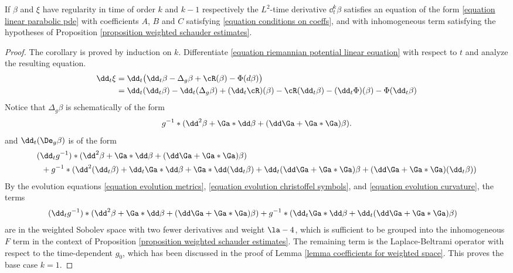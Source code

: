 \documentclass[hidelinks, 12pt, oneside, reqno]{amsart}
\begin{document}
\begin{cor}\label{corollary coefficients for weighted space time derivs}
    If $\beta$ and $\xi$ have regularity in time of order $k$ and $k-1$ respectively the $L^2$-time derivative $\dd^k_t \beta$ satisfies an equation of the form \eqref{equation linear parabolic pde} with coefficients $A$, $B$ and $C$ satisfying \eqref{equation conditions on coeffs}, and with inhomogeneous term satisfying the hypotheses of Proposition \ref{proposition weighted schauder estimates}. 
\end{cor}

\begin{proof}
The corollary is proved by induction on $k$. Differentiate \eqref{equation riemannian potential linear equation} with respect to $t$ and analyze the resulting equation. 
\begin{align*}
    \dd_t \xi &= \dd_t\big(\dd_t \beta - \Delta_g \beta + \cR(\beta) - \Phi(d\beta)\big)  \\
    &= \dd_t (\dd_t \beta) - \dd_t (\Delta_g \beta) + (\dd_t\cR)(\beta) - \cR(\dd_t \beta) - (\dd_t \Phi)(\beta) - \Phi(\dd_t \beta)
\end{align*}
Notice that $ \Delta_g \beta $ is schematically of the form 
\[
g^{-1} * (\dd^2 \beta + \Ga * \dd \beta + (\dd \Ga + \Ga * \Ga) \beta). 
\]
and $\dd_t (\De_g \beta)$ is of the form
\begin{align*}
    &(\dd_t g^{-1}) * (\dd^2 \beta + \Ga * \dd \beta + (\dd \Ga + \Ga * \Ga) \beta) \\
    &\;\;+ g^{-1} * (\dd^2 (\dd_t \beta) + \dd_t \Ga * \dd \beta + \Ga * \dd (\dd_t \beta) +  \dd_t(\dd \Ga + \Ga * \Ga) \beta + (\dd \Ga + \Ga * \Ga) (\dd_t \beta))
\end{align*}
By the evolution equations \eqref{equation evolution metrics}, \eqref{equation evolution christoffel symbols}, and \eqref{equation evolution curvature}, the terms 
\begin{align*}
    &(\dd_t g^{-1}) * (\dd^2 \beta + \Ga * \dd \beta + (\dd \Ga + \Ga * \Ga) \beta) + g^{-1} * (\dd_t \Ga * \dd \beta +  \dd_t(\dd \Ga + \Ga * \Ga) \beta )
\end{align*}
are in the weighted Sobolev space with two fewer derivatives and weight $\la -4$, which is sufficient to be grouped into the inhomogeneous $F$ term in the context of Proposition \ref{proposition weighted schauder estimates}. The remaining term is the Laplace-Beltrami operator with respect to the time-dependent $g_0$, which has been discussed in the proof of Lemma \ref{lemma coefficients for weighted space}. This proves the base case $k =1$. 


\end{proof}
\end{document}
